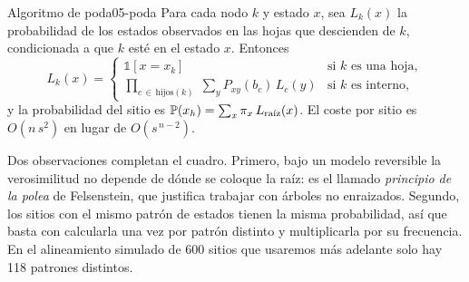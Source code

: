 \begin{teorema}{Algoritmo de poda}{05-poda}
Para cada nodo $k$ y estado $x$, sea $L_k(x)$ la probabilidad de los estados observados en las hojas que descienden de $k$, condicionada a que $k$ esté en el estado $x$. Entonces
\begin{equation}\label{eq:05-poda}
L_k(x) = \begin{cases}
\mathbb 1\left[x = x_k\right] & \text{si } k \text{ es una hoja},\\[4pt]
\displaystyle\prod_{c\,\in\,\mathrm{hijos}(k)}\;\sum_{y} P_{xy}(b_c)\,L_c(y) & \text{si } k \text{ es interno},
\end{cases}
\end{equation}
y la probabilidad del sitio es $\mathbb{P}(x_h) = \sum_x \pi_x\,L_{\text{raíz}}(x)$.
El coste por sitio es $O(n\,s^2)$ en lugar de $O(s^{\,n-2})$.
\end{teorema}

\begin{simbolos}
\end{simbolos}

Dos observaciones completan el cuadro. Primero, bajo un modelo reversible la verosimilitud no depende de dónde se coloque la raíz: es el llamado \emph{principio de la polea} de Felsenstein, que justifica trabajar con árboles no enraizados. Segundo, los sitios con el mismo patrón de estados tienen la misma probabilidad, así que basta con calcularla una vez por patrón distinto y multiplicarla por su frecuencia. En el alineamiento simulado de 600 sitios que usaremos más adelante solo hay 118 patrones distintos.

